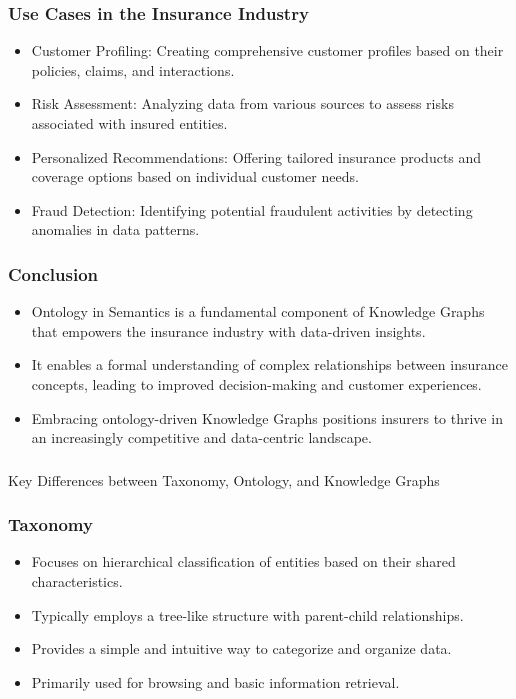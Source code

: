 \begin{frame}[fragile]
\frametitle{Use Cases in the Insurance Industry}
\begin{itemize}
\item Customer Profiling: Creating comprehensive customer profiles based on their policies, claims, and interactions.
\item Risk Assessment: Analyzing data from various sources to assess risks associated with insured entities.
\item Personalized Recommendations: Offering tailored insurance products and coverage options based on individual customer needs.
\item Fraud Detection: Identifying potential fraudulent activities by detecting anomalies in data patterns.
\end{itemize}
\end{frame}

\begin{frame}[fragile]
\frametitle{Conclusion}
\begin{itemize}
\item Ontology in Semantics is a fundamental component of Knowledge Graphs that empowers the insurance industry with data-driven insights.
\item It enables a formal understanding of complex relationships between insurance concepts, leading to improved decision-making and customer experiences.
\item Embracing ontology-driven Knowledge Graphs positions insurers to thrive in an increasingly competitive and data-centric landscape.
\end{itemize}
\end{frame}


\begin{frame}[fragile]\frametitle{}
\begin{center}
{\Large Key Differences between Taxonomy, Ontology, and Knowledge Graphs }
\end{center}
\end{frame}


\begin{frame}[fragile]
\frametitle{Taxonomy}

\begin{itemize}
\item Focuses on hierarchical classification of entities based on their shared characteristics.
\item Typically employs a tree-like structure with parent-child relationships.
\item Provides a simple and intuitive way to categorize and organize data.
\item Primarily used for browsing and basic information retrieval.
\end{itemize}
\end{frame}


